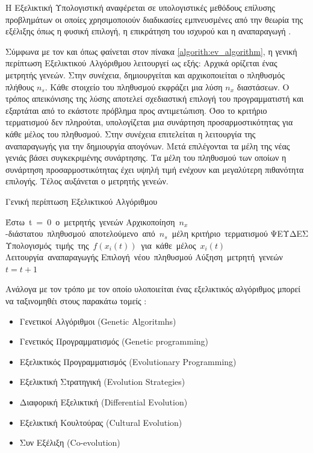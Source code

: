 \documentclass{assignment}
\begin{document}
Η Εξελικτική Υπολογιστική αναφέρεται σε υπολογιστικές μεθόδους επίλυσης
προβλημάτων οι οποίες χρησιμοποιούν διαδικασίες εμπνευσμένες από την θεωρία
της εξέλιξης όπως η φυσική επιλογή, η επικράτηση του ισχυρού και η
αναπαραγωγή \cite{engelbrecht}.

Σύμφωνα με τον \citet{engelbrecht} και όπως φαίνεται στον πίνακα
\ref{algorith:ev_algorithm}, η γενική
περίπτωση Εξελικτικού Αλγόριθμου λειτουργεί ως εξής: Αρχικά ορίζεται ένας
μετρητής γενεών. Στην συνέχεια, δημιουργείται και αρχικοποιείται ο πληθυσμός
πλήθους $n_s$. Κάθε στοιχείο του πληθυσμού εκφράζει μια λύση $n_x$ διαστάσεων.
Ο τρόπος απεικόνισης της λύσης αποτελεί σχεδιαστική επιλογή του προγραμματιστή
και εξαρτάται από το εκάστοτε πρόβλημα προς αντιμετώπιση. Όσο το κριτήριο
τερματισμού δεν πληρούται, υπολογίζεται μια συνάρτηση προσαρμοστικότητας για
κάθε μέλος του πληθυσμού. Στην συνέχεια επιτελείται η λειτουργία της
αναπαραγωγής για την δημιουργία απογόνων. Μετά επιλέγονται τα μέλη της νέας
γενιάς βάσει συγκεκριμένης συνάρτησης. Τα μέλη του πληθυσμού των οποίων
η συνάρτηση προσαρμοστικότητας έχει υψηλή τιμή ενέχουν και μεγαλύτερη πιθανότητα
επιλογής. Τέλος αυξάνεται ο μετρητής γενεών.
\begin{algorithm}                        %
\caption{Γενική περίπτωση Εξελικτικού Αλγόριθμου}          %
\label{algorith:ev_algorithm}                      %
\begin{program}
    \mbox{Έστω t = 0 ο μετρητής γενεών}
    \mbox{Αρχικοποίηση $n_x$-διάστατου πληθυσμού αποτελούμενο από $n_s$ μέλη}
    \WHILE \mbox{κριτήριο τερματισμού} \mbox{ΨΕΥΔΕΣ} \DO
        \mbox{Υπολογισμός τιμής της $f(x_i(t))$ για κάθε μέλος $x_i(t)$}
        \mbox{Λειτουργία αναπαραγωγής}
        \mbox{Επιλογή νέου πληθυσμού}
        \mbox{Αύξηση μετρητή γενεών $t = t + 1$}
    \END
\end{program}
\end{algorithm}

Ανάλογα με τον τρόπο με τον οποίο υλοποιείται ένας εξελικτικός αλγόριθμος
μπορεί να ταξινομηθέι στους παρακάτω τομείς \cite{engelbrecht}:
\begin{itemize}
    \item Γενετικοί Αλγόριθμοι (Genetic Algoritmhs)
    \item Γενετικός Προγραμματισμός (Genetic programming)
    \item Εξελικτικός Προγραμματισμός (Evolutionary Programming)
    \item Εξελικτική Στρατηγική (Evolution Strategies)
    \item Διαφορική Εξελικτική (Differential Evolution)
    \item Εξελικτική Κουλτούρας (Cultural Evolution)
    \item Συν Εξέλιξη (Co-evolution)
\end{itemize}
\end{document}
